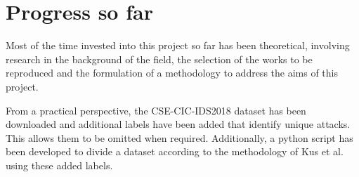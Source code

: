 \chapter{Progress so far}%
\label{chp:progress}

Most of the time invested into this project so far has been theoretical,
involving research in the background of the field, the selection of the works
to be reproduced and the formulation of a methodology to address the aims of
this project.

From a practical perspective, the CSE-CIC-IDS2018 dataset has been downloaded
and additional labels have been added that identify unique attacks. This allows
them to be omitted when required. Additionally, a python script has been
developed to divide a dataset according to the methodology of Kus et al.~\cite{Kus} using
these added labels.